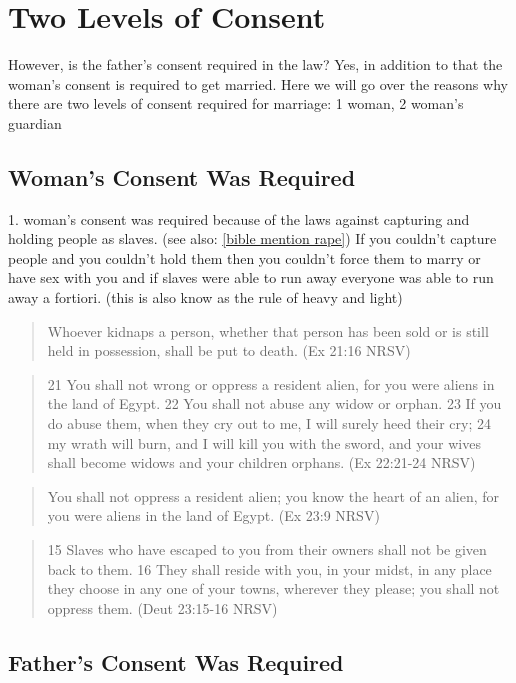 \documentclass[11pt]{article}
\begin{document}
\section{Two Levels of Consent}
However, is the father's consent required in the law? Yes, in addition to that the woman's consent is required to get married. Here we will go over the reasons why there are two levels of consent required for marriage: 1 woman, 2 woman’s guardian

\subsection{Woman's Consent Was Required}

1. woman’s consent was required because of the laws against capturing and holding people as slaves. (see also: \ref{bible mention rape}) If you couldn't capture people and you couldn't hold them then you couldn't force them to marry or have sex with you and if slaves were able to run away everyone was able to run away a fortiori. (this is also know as the rule of heavy and light)
\begin{quote}
 Whoever kidnaps a person, whether that person has been sold or is still held in possession, shall be put to death. (Ex 21:16 NRSV)
\end{quote}
\begin{quote}
21 You shall not wrong or oppress a resident alien, for you were aliens in the land of Egypt. 22 You shall not abuse any widow or orphan. 23 If you do abuse them, when they cry out to me, I will surely heed their cry; 24 my wrath will burn, and I will kill you with the sword, and your wives shall become widows and your children orphans. (Ex 22:21-24 NRSV)
\end{quote}
\begin{quote}
You shall not oppress a resident alien; you know the heart of an alien, for you were aliens in the land of Egypt. (Ex 23:9 NRSV)
\end{quote}
\begin{quote}
15 Slaves who have escaped to you from their owners shall not be given back to them. 16 They shall reside with you, in your midst, in any place they choose in any one of your towns, wherever they please; you shall not oppress them. (Deut 23:15-16 NRSV)
\end{quote}

\subsection{Father's Consent Was Required}
\end{document}
